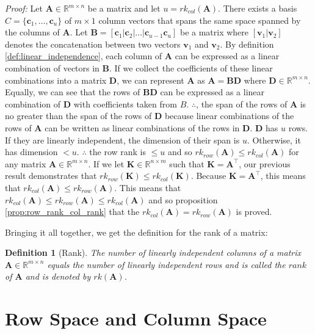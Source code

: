 \documentclass[a4paper,12pt]{book}
\newcommand{\matrx}[1]{\bm{#1}}
\newcommand{\vectr}[1]{\textbf{#1}}
\newcommand{\real}{\mathbb{R}}
\newcommand{\italic}[1]{\textit{#1}}
\newcommand{\rrank}[1]{rk_{row}(\matrx{#1})}
\newcommand{\crank}[1]{rk_{col}(\matrx{#1})}
\newtheorem{definition}{Definition}[section]
\begin{document}
	\noindent\italic{Proof:}
	Let $ \matrx{A} \in \real^{m \times n}$ be a matrix and let $ u = \crank{A} $. There exists a basis $ C = \{\vectr{c}_1, \ldots, \vectr{c}_u\} $ of $ m \times 1 $ column vectors that spans the same space spanned by the columns of $ \vectr{A} $. 
	Let $ \matrx{B} = [\vectr{c}_1 | \vectr{c}_2 | \ldots | \vectr{c}_{u - 1} \vectr{c}_u] $ be a matrix where $ [\vectr{v}_1 | \vectr{v}_2] $ denotes the concatenation between two vectors $ \vectr{v}_1 $ and $ \vectr{v}_2 $. By definition \ref{def:linear_independence}, each column of $ \matrx{A} $ can be expressed as a linear combination of vectors in $ \matrx{B} $. If we collect the coefficients of these linear combinations into a matrix $ \matrx{D} $, we can represent $ \matrx{A} $ as $ \matrx{A} = \matrx{BD} $ where $ \matrx{D} \in \real^{m \times n}$. Equally, we can see that the rows of $ \matrx{BD} $ can be expressed as a linear combination of $ \matrx{D} $ with coefficients taken from $ B $. $ \therefore $, the span of the rows of $ \matrx{A} $ is no greater than the span of the rows of $ \matrx{D} $ because linear combinations of the rows of $ \matrx{A} $ can be written as linear combinations of the rows in $ \matrx{D} $. $ \matrx{D} $ has $ u $ rows. If they are linearly independent, the dimension of their span is $ u $. Otherwise, it has dimension $ < u $. $ \therefore $ the row rank is $ \leq u $ and so $ \rrank{A} \leq \crank{A} $ for any matrix $ \matrx{A} \in \real^{m \times n} $. If we let $ \matrx{K} \in \real^{n \times m} $ such that $ \matrx{K} = \matrx{A}^{\top} $, our previous result demonstrates that $ \rrank{K} \leq \crank{K} $. Because $ \matrx{K} = \matrx{A}^{\top} $, this means that $ \crank{A} \leq \rrank{A} $. This means that $ \crank{A} \leq \rrank{A} \leq \crank{A} $ and so proposition \ref{prop:row_rank_col_rank} that the $ \crank{A} = \rrank{A} $ is proved. 
	
	Bringing it all together, we get the definition for the rank of a matrix:
	\begin{definition}[Rank]
		\normalfont The number of linearly independent columns of a matrix $\textbf{A} \in \mathbb{R}^{m \times n}$ equals the number of linearly independent rows and is called the $\textit{rank}$ of $\textbf{A}$ and is denoted by $rk(\textbf{A})$.
	\end{definition}

	\section{Row Space and Column Space}
	
\end{document}
